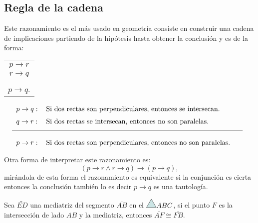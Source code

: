 \subsection{Regla de la cadena}
Este razonamiento es el m\'as usado en geometr\'ia consiste en construir una
cadena de implicaciones partiendo de la hip\'otesis hasta obtener la
conclusi\'on y es de la forma:
\begin{center}
 \begin{tabular}{c}
$p\longrightarrow r$\\
$r\longrightarrow q$\\
\hline \\
$p\longrightarrow q$.\\
 \end{tabular}
\end{center}
\begin{ejemplo}{\[%
\begin{tabular}
[c]{lll}%
$p\rightarrow q:$ & $\text{Si dos rectas son perpendiculares, entonces se
intersecan.}$\medskip & \\
$q\rightarrow r:$ & $\text{Si dos rectas se intersecan, entonces no son
paralelas.}$\medskip & \\\hline \\
$p\rightarrow r:$ & $\text{Si dos rectas son perpendiculares, entonces no
son paralelas.}$ &
\end{tabular}
\ \
\]}
 \end{ejemplo}
Otra forma de interpretar este razonamiento es: $$\left( p\longrightarrow r
\wedge r\longrightarrow q\right)  \longrightarrow \left(
p\longrightarrow q\right), $$ mirándola de esta forma el razonamiento es
equivalente si la conjunción es cierta entonces la conclusi\'on tambi\'en lo es
decir $p\longrightarrow q$ es una tautología.
\begin{ejemplo}{Sea $\overleftrightarrow{ED}$ una mediatriz del
segmento $\overline{AB}$ en el $\triangulo{ABC}$, si el punto $F$  es
la intersección de lado $AB$ y la mediatriz, entonces
$\overline{AF}\cong \overline{FB}.$ }
\end{ejemplo}

